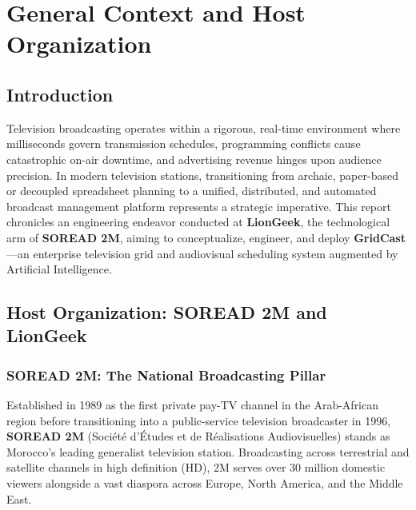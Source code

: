 \documentclass[12pt,a4paper,oneside]{report}
\begin{document}
\newpage

\tableofcontents
\newpage
\listoffigures
\newpage
\listoftables
\newpage

\setcounter{page}{1}


\chapter{General Context and Host Organization}
\label{chap:context}

\section{Introduction}
Television broadcasting operates within a rigorous, real-time environment where milliseconds govern transmission schedules, programming conflicts cause catastrophic on-air downtime, and advertising revenue hinges upon audience precision. In modern television stations, transitioning from archaic, paper-based or decoupled spreadsheet planning to a unified, distributed, and automated broadcast management platform represents a strategic imperative. This report chronicles an engineering endeavor conducted at \textbf{LionGeek}, the technological arm of \textbf{SOREAD 2M}, aiming to conceptualize, engineer, and deploy \textbf{GridCast}---an enterprise television grid and audiovisual scheduling system augmented by Artificial Intelligence.

\section{Host Organization: SOREAD 2M and LionGeek}

\subsection{SOREAD 2M: The National Broadcasting Pillar}
Established in 1989 as the first private pay-TV channel in the Arab-African region before transitioning into a public-service television broadcaster in 1996, \textbf{SOREAD 2M} (Société d'Études et de Réalisations Audiovisuelles) stands as Morocco's leading generalist television station. Broadcasting across terrestrial and satellite channels in high definition (HD), 2M serves over 30 million domestic viewers alongside a vast diaspora across Europe, North America, and the Middle East.
\end{document}
